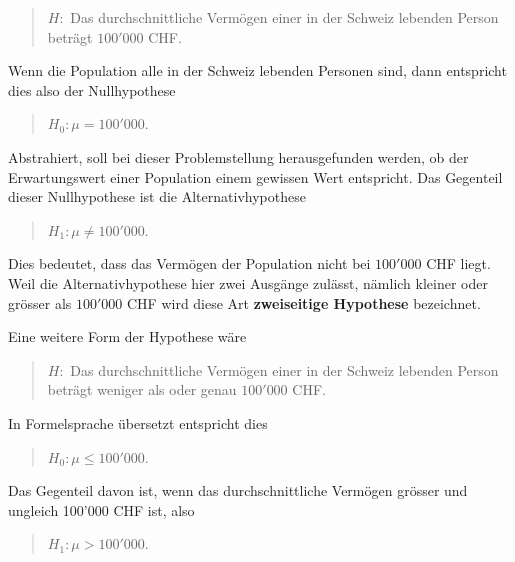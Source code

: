 \documentclass[
]{book}
\theoremstyle{definition}
\theoremstyle{definition}
\theoremstyle{definition}
\theoremstyle{definition}
\theoremstyle{remark}
\begin{document}
\begin{quote}
\(H:\) Das durchschnittliche Vermögen einer in der Schweiz lebenden Person beträgt \(100'000\) CHF.
\end{quote}

Wenn die Population alle in der Schweiz lebenden Personen sind, dann entspricht dies also der Nullhypothese

\begin{quote}
\(H_0:\mu = 100'000\).
\end{quote}

Abstrahiert, soll bei dieser Problemstellung herausgefunden werden, ob der Erwartungswert einer Population einem gewissen Wert entspricht. Das Gegenteil dieser Nullhypothese ist die Alternativhypothese

\begin{quote}
\(H_1: \mu \neq 100'000\).
\end{quote}

Dies bedeutet, dass das Vermögen der Population nicht bei \(100'000\) CHF liegt. \label{customdef-zweiseitige-hypothese}{Weil die Alternativhypothese hier zwei Ausgänge zulässt, nämlich kleiner oder grösser als \(100'000\) CHF wird diese Art \textbf{zweiseitige Hypothese} bezeichnet.}

Eine weitere Form der Hypothese wäre

\begin{quote}
\(H:\) Das durchschnittliche Vermögen einer in der Schweiz lebenden Person beträgt weniger als oder genau \(100'000\) CHF.
\end{quote}

In Formelsprache übersetzt entspricht dies

\begin{quote}
\(H_0: \mu \leq 100'000\).
\end{quote}

Das Gegenteil davon ist, wenn das durchschnittliche Vermögen grösser und ungleich 100'000 CHF ist, also

\begin{quote}
\(H_1: \mu > 100'000\).
\end{quote}
\end{document}
